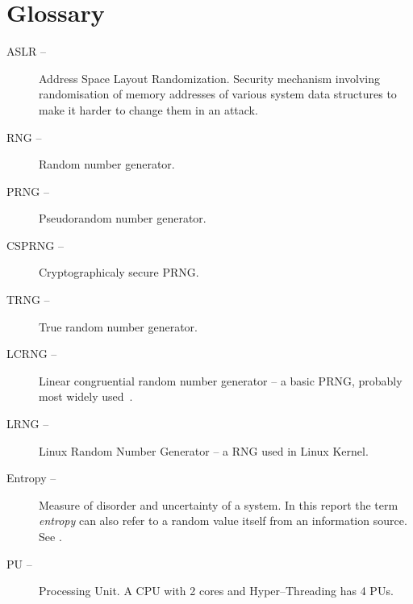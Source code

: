 \chapter{Glossary}\label{chap:glossary}

\begin{description}
 \item [ASLR --] Address Space Layout Randomization. Security mechanism involving randomisation of memory addresses of various system data structures to make it harder to change them in an attack.
 \item [RNG --] Random number generator.
 \item [PRNG --] Pseudorandom number generator.
 \item [CSPRNG --] Cryptographicaly secure PRNG.
 \item [TRNG --] True random number generator.
 \item [LCRNG --] Linear congruential random number generator -- a basic PRNG,
 	probably most widely used~\cite[p.~151]{CryptographyAndNetworkSecurity}.
 \item [LRNG --] Linux Random Number Generator -- a RNG used in Linux Kernel.
 \item [Entropy --] Measure of disorder and uncertainty of a system. 
 	In this report the term {\em entropy} can also refer to a random value itself 
	from an information source. See .
\item [PU --] Processing Unit. A CPU with 2 cores and Hyper--Threading has 4 PUs.
\end{description}
